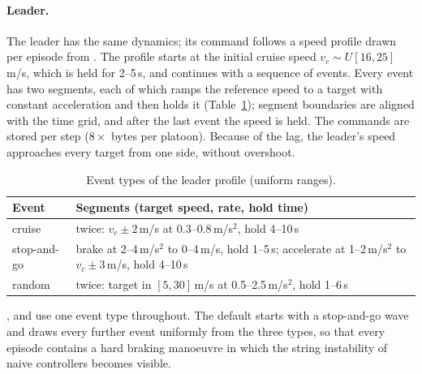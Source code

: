 \paragraph{Leader.} The leader has the same dynamics; its command follows a
speed profile drawn per episode from . The profile starts
at the initial cruise speed $v_c \sim U[16, 25]$\,m/s, which is held for
2--5\,s, and continues with a sequence of events. Every event has two segments,
each of which ramps the reference speed to a target with constant acceleration
and then holds it (Table~\ref{tab:platoon-scenarios}); segment boundaries are
aligned with the time grid, and after the last event the speed is held. The
commands are stored per step ($8 \times$  bytes per platoon).
Because of the lag, the leader's speed approaches every target from one side,
without overshoot.

\begin{table}[htbp]
  \centering\small
  \caption{Event types of the leader profile (uniform ranges).}
  \label{tab:platoon-scenarios}
  \begin{tabularx}{\textwidth}{@{}l>{\raggedright\arraybackslash}X@{}}
    \toprule
    Event & Segments (target speed, rate, hold time) \\
    \midrule
    cruise & twice: $v_c \pm 2$\,m/s at 0.3--0.8\,m/s$^2$, hold 4--10\,s \\
    stop-and-go & brake at 2--4\,m/s$^2$ to 0--4\,m/s, hold 1--5\,s; accelerate at
      1--2\,m/s$^2$ to $v_c \pm 3$\,m/s, hold 4--10\,s \\
    random & twice: target in $[5, 30]$\,m/s at 0.5--2.5\,m/s$^2$, hold 1--6\,s \\
    \bottomrule
  \end{tabularx}
\end{table}

,  and  use one event
type throughout. The default  starts with a stop-and-go wave and
draws every further event uniformly from the three types, so that every episode
contains a hard braking manoeuvre in which the string instability of naive
controllers becomes visible.

